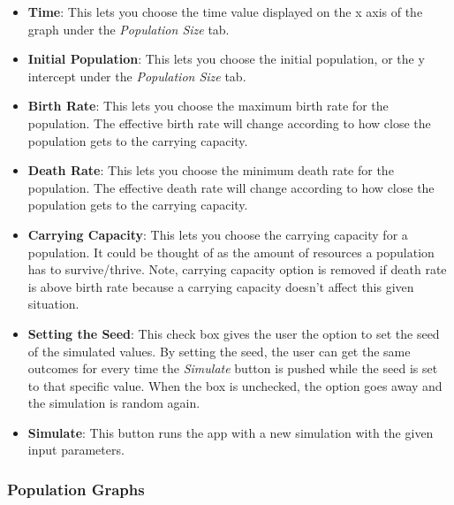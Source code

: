 \documentclass{article}\usepackage[]{graphicx}\usepackage[]{color}
\begin{document}
\begin{itemize}

\item \textbf{Time}: This lets you choose the time value displayed on the x axis of the graph under the \textit{Population Size} tab.

\item \textbf{Initial Population}: This lets you choose the initial population, or the y intercept under the \textit{Population Size} tab.

\item \textbf{Birth Rate}: This lets you choose the maximum birth rate for the population. The effective birth rate will change according to how close the population gets to the carrying capacity.

\item \textbf{Death Rate}: This lets you choose the minimum death rate for the population. The effective death rate will change according to how close the population gets to the carrying capacity.

\item \textbf{Carrying Capacity}: This lets you choose the carrying capacity for a population. It could be thought of as the amount of resources a population has to survive/thrive. Note, carrying capacity option is removed if death rate is above birth rate because a carrying capacity doesn't affect this given situation.

\item \textbf{Setting the Seed}: This check box gives the user the option to set the seed of the simulated values. By setting the seed, the user can get the same outcomes for every time the \textit{Simulate} button is pushed while the seed is set to that specific value. When the box is unchecked, the option goes away and the simulation is random again.

\item \textbf{Simulate}: This button runs the app with a new simulation with the given input parameters.

\end{itemize}

\subsubsection{Population Graphs}
\end{document}
